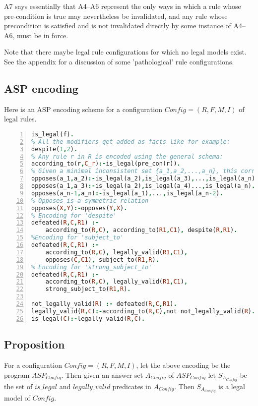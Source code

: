 A7 says essentially that A4--A6 represent the only ways in which a rule whose pre-condition is true may nevertheless be invalidated, and any rule whose precondition is satisfied and is not invalidated directly by some instance of A4--A6, must be in force. 

Note that there maybe legal rule configurations for which no legal models exist. See the appendix for a discussion of some 'pathological' rule configurations.

\subsection{ASP encoding}
Here is an ASP encoding scheme for a configuration $Config = (R,F,M,I)$ of legal rules.
\begin{lstlisting}[language=Prolog, numbers=left]
% For any f in F, we have:
is_legal(f). 
% All the modifiers get added as facts like for example:
despite(1,2).
% Any rule r in R is encoded using the general schema:
according_to(r,C_r):-is_legal(pre_con(r)).
% Given a minimal inconsistent set {a_1,a_2,...,a_n}, this corresponds to a set of rules:
opposes(a_1,a_2):-is_legal(a_2),is_legal(a_3),...,is_legal(a_n).
opposes(a_1,a_3):-is_legal(a_2),is_legal(a_4)...,is_legal(a_n).  % etc ...
opposes(a_n-1,a_n):-is_legal(a_1),...,is_legal(a_n-2).               
% Opposes is a symmetric relation
opposes(X,Y):-opposes(Y,X).
% Encoding for 'despite'
defeated(R,C,R1) :-
    according_to(R,C), according_to(R1,C1), despite(R,R1).
%Encoding for 'subject_to'
defeated(R,C,R1) :-
    according_to(R,C), legally_valid(R1,C1),
    opposes(C,C1), subject_to(R1,R).
% Encoding for 'strong_subject_to'
defeated(R,C,R1) :-
    according_to(R,C), legally_valid(R1,C1),
    strong_subject_to(R1,R).

not_legally_valid(R) :- defeated(R,C,R1).
legally_valid(R,C):-according_to(R,C),not not_legally_valid(R).
is_legal(C):-legally_valid(R,C).
\end{lstlisting}
\subsection{Proposition}

\begin{proposition}\label{lemma:legal_model_of_config}
For a configuration $Config=(R,F,M,I)$, let the above encoding be the program $ASP_{Config}$. Then given an answer set $A_{Config}$ of $ASP_{Config}$ let $S_{A_{Config}}$ be the set of $is\_legal$ and $legally\_valid$ predicates in $A_{Config}$. Then $S_{A_{Config}}$ is a legal model of $Config$. 
\end{proposition}


